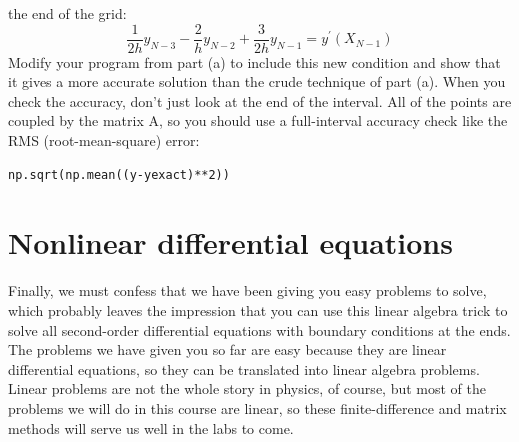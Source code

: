 \documentclass{book}
\theoremstyle{plain}
\theoremstyle{definition}
\numberwithin{exm}{chapter}
\theoremstyle{remark}
\theoremstyle{summary}
\theoremstyle{overview}
\begin{document}
\begin{enumerate}[label=(\alph*)]
the end of the grid:
	\begin{equation}\label{eq:210}
		\frac{1}{2h} y_{N-3} - \frac{2}{h} y_{N-2} + \frac{3}{2h} y_{N-1} = y^\prime(X_{N-1})
	\end{equation}
Modify your program from part (a) to include this new condition and
show that it gives a more accurate solution than the crude technique of
part (a). When you check the accuracy, don\rq t just look at the end of the
interval. All of the points are coupled by the matrix A, so you should
use a full-interval accuracy check like the RMS (root-mean-square)
error:
\begin{lstlisting}
np.sqrt(np.mean((y-yexact)**2))
\end{lstlisting}
\end{enumerate}

\section*{Nonlinear differential equations}
Finally, we must confess that we have been giving you easy problems to solve,
which probably leaves the impression that you can use this linear algebra trick
to solve all second-order differential equations with boundary conditions at the
ends. The problems we have given you so far are easy because they are linear
differential equations, so they can be translated into linear algebra problems.
Linear problems are not the whole story in physics, of course, but most of the
problems we will do in this course are linear, so these finite-difference and matrix
methods will serve us well in the labs to come.
\end{document}
